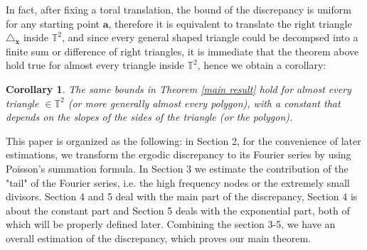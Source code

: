 \documentclass[11pt]{article}
\newtheorem{thm}{Theorem}[section]
\newtheorem{cor}{Corollary}[section]
\newcommand{\fc}{\frac}
\newcommand{\T}{\mathbb{T}}
\newcommand{\R}{\mathbb{R}}
\renewcommand{\a}{\alpha}
\newcommand{\e}{\epsilon}
\renewcommand{\(}{\left(}
\renewcommand{\)}{\right)}
\renewcommand{\bf}{\mathbf}
\newcommand{\tria}{\triangle_{\bf{x}}}
\newcommand{\C}{\mathcal{C}}
\newcommand{\<}{\langle}
\renewcommand{\>}{\rangle}
\begin{document}
In fact, after fixing a toral translation, the bound of the discrepancy is uniform for any starting point $\bm{a}$, therefore it is equivalent to translate the right triangle $\tria$ inside $\T^2$, and since every general shaped triangle could be decompsed into a finite sum or difference of right triangles, it is immediate that the theorem above hold true for almost every triangle inside $\T^2$, hence we obtain a corollary:
\begin{cor}\label{Corollary for triangles of general shape}
The same bounds in Theorem \ref{main result} hold for almost every triangle $\in \T^2$ (or more generally almost every polygon), with a constant that depends on the slopes of the sides of the triangle (or the polygon).
\end{cor}

This paper is organized as the following: in Section 2, for the convenience of later estimations, we transform the ergodic discrepancy to its Fourier series by using Poisson's summation formula. In Section 3 we estimate the contribution of the "tail" of the Fourier series, i.e. the high frequency nodes or the extremely small divisors. Section 4 and 5 deal with the main part of the discrepancy, Section 4 is about the constant part and Section 5 deals with the exponential part, both of which will be properly defined later. Combining the section 3-5, we have an overall estimation of the discrepancy, which proves our main theorem.
\end{document}
